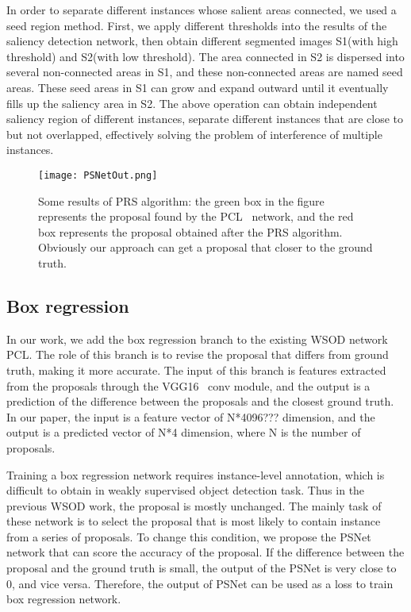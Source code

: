 \documentclass[final,3p,times,twocolumn]{elsarticle}
\begin{document}
In order to separate different instances whose salient areas connected, we used a seed region method. First, we apply different thresholds into the results of the saliency detection network, then obtain different segmented images S1(with high threshold) and S2(with low threshold). The area connected in S2 is dispersed into several non-connected areas in S1, and these non-connected areas are named seed areas. These seed areas in S1 can grow and expand outward until it eventually fills up the saliency area in S2. The above operation can obtain independent saliency region of different instances, separate different instances that are close to but not overlapped, effectively solving the problem of interference of multiple instances.

\begin{figure}[t]
	\begin{center}
\texttt{[image: PSNetOut.png]}
	\end{center}
	\caption{Some results of PRS algorithm: the green box in the figure represents the proposal found by the PCL~\cite{tang2018pcl} network, and the red box represents the proposal obtained after the PRS algorithm. Obviously our approach can get a proposal that closer to the ground truth.}
	\label{fig:figure4}
\end{figure}

\subsection{Box regression}
In our work, we add the box regression branch to the existing WSOD network PCL. The role of this branch is to revise the proposal that differs from ground truth, making it more accurate. The input of this branch is features extracted from the proposals through the VGG16~\cite{simonyan2014very} conv module, and the output is a prediction of the difference between the proposals and the closest ground truth. In our paper, the input is a feature vector of N*4096??? dimension, and the output is a predicted vector of N*4 dimension, where N is the number of proposals.

Training a box regression network requires instance-level annotation, which is difficult to obtain in weakly supervised object detection task. Thus in the previous WSOD work, the proposal is mostly unchanged. The mainly task of these network is to select the proposal that is most likely to contain instance from a series of proposals. To change this condition, we propose the PSNet network that can score the accuracy of the proposal. If the difference between the proposal and the ground truth is small, the output of the PSNet is very close to 0, and vice versa. Therefore, the output of PSNet can be used as a loss to train box regression network.
\end{document}
